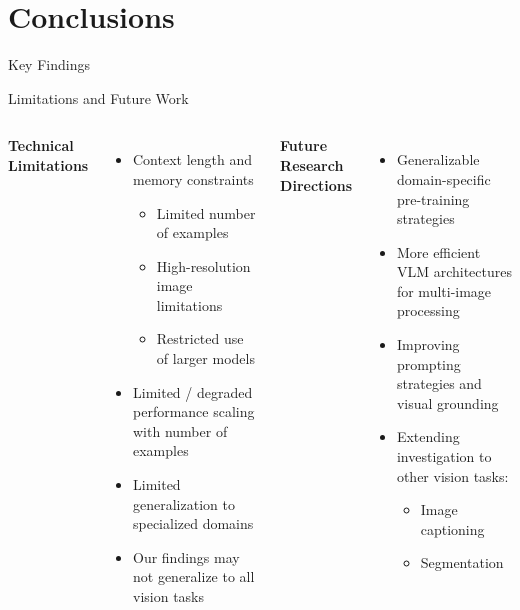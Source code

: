 \documentclass[aspectratio=169]{beamer}
\newcommand\customcolumnwidth{0.4625\textwidth}
\begin{document}
\section{Conclusions}
\begin{frame}{Key Findings}
\end{frame}

\begin{frame}{Limitations and Future Work}
    \begin{columns}[T]
        \column{\customcolumnwidth}
            \textbf{Technical Limitations}
            \begin{itemize}
                \item Context length and memory constraints
                \begin{itemize}
                    \item Limited number of examples
                    \item High-resolution image limitations
                    \item Restricted use of larger models
                \end{itemize}
                \item Limited / degraded performance scaling with number of examples
                \item Limited generalization to specialized domains
                \item Our findings may not generalize to all vision tasks
            \end{itemize}
        \column{\customcolumnwidth}
            \textbf{Future Research Directions}
            \begin{itemize}
                \item Generalizable domain-specific pre-training strategies
                \item More efficient VLM architectures for multi-image processing
                \item Improving prompting strategies and visual grounding~
                \item Extending investigation to other vision tasks:
                \begin{itemize}
                    \item Image captioning
                    \item Segmentation
                \end{itemize}
            \end{itemize}
    \end{columns}
\end{frame}
\end{document}
